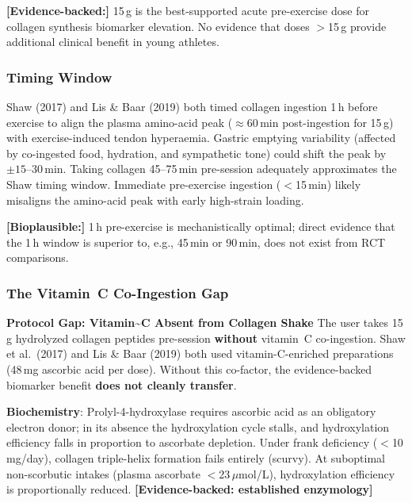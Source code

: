 \textbf{[Evidence-backed:]} 15\,g is the best-supported acute pre-exercise dose for collagen synthesis biomarker elevation. No evidence that doses $>$15\,g provide additional clinical benefit in young athletes.

\subsubsection{Timing Window}

Shaw (2017) and Lis \& Baar (2019) both timed collagen ingestion 1\,h before exercise to align the plasma amino-acid peak (${\approx}60$\,min post-ingestion for 15\,g) with exercise-induced tendon hyperaemia. Gastric emptying variability (affected by co-ingested food, hydration, and sympathetic tone) could shift the peak by ${\pm}15$--30\,min. Taking collagen 45--75\,min pre-session adequately approximates the Shaw timing window. Immediate pre-exercise ingestion ($<$15\,min) likely misaligns the amino-acid peak with early high-strain loading.

\textbf{[Bioplausible:]} 1\,h pre-exercise is mechanistically optimal; direct evidence that the 1\,h window is superior to, e.g., 45\,min or 90\,min, does not exist from RCT comparisons.

\subsubsection{The Vitamin~C Co-Ingestion Gap}
\label{subsubsec:vitc}

\begin{warningbox}{\textbf{Protocol Gap: Vitamin\textasciitilde{}C Absent from Collagen Shake}}
The user takes 15\,g hydrolyzed collagen peptides pre-session \textbf{without} vitamin~C co-ingestion. Shaw et al.\ (2017) and Lis \& Baar (2019) both used vitamin-C-enriched preparations (48\,mg ascorbic acid per dose). Without this co-factor, the evidence-backed biomarker benefit \textbf{does not cleanly transfer}.
\end{warningbox}

\textbf{Biochemistry}: Prolyl-4-hydroxylase requires ascorbic acid as an obligatory electron donor; in its absence the hydroxylation cycle stalls, and hydroxylation efficiency falls in proportion to ascorbate depletion. Under frank deficiency ($<$10\,mg/day), collagen triple-helix formation fails entirely (scurvy). At suboptimal non-scorbutic intakes (plasma ascorbate $<$23\,$\mu$mol/L), hydroxylation efficiency is proportionally reduced. \textbf{[Evidence-backed: established enzymology]}

